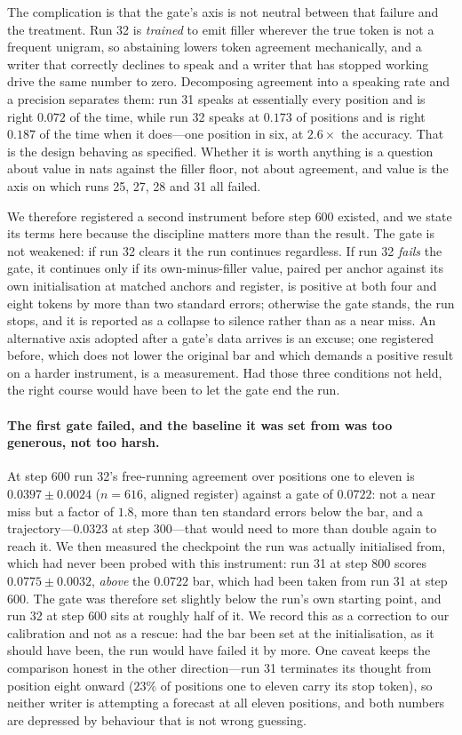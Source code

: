 \documentclass{article} %
\begin{document}
The complication is that the gate's axis is not neutral between that failure and the treatment. Run 32
is \emph{trained} to emit filler wherever the true token is not a frequent unigram, so abstaining lowers
token agreement mechanically, and a writer that correctly declines to speak and a writer that has
stopped working drive the same number to zero. Decomposing agreement into a speaking rate and a
precision separates them: run 31 speaks at essentially every position and is right $0.072$ of the time,
while run 32 speaks at $0.173$ of positions and is right $0.187$ of the time when it does---one position
in six, at $2.6\times$ the accuracy. That is the design behaving as specified. Whether it is worth
anything is a question about value in nats against the filler floor, not about agreement, and value is
the axis on which runs 25, 27, 28 and 31 all failed.

We therefore registered a second instrument before step $600$ existed, and we state its terms here
because the discipline matters more than the result. The gate is not weakened: if run 32 clears it the
run continues regardless. If run 32 \emph{fails} the gate, it continues only if its own-minus-filler
value, paired per anchor against its own initialisation at matched anchors and register, is positive at
both four and eight tokens by more than two standard errors; otherwise the gate stands, the run stops,
and it is reported as a collapse to silence rather than as a near miss. An alternative axis adopted
after a gate's data arrives is an excuse; one registered before, which does not lower the original bar
and which demands a positive result on a harder instrument, is a measurement. Had those three
conditions not held, the right course would have been to let the gate end the run.

\paragraph{The first gate failed, and the baseline it was set from was too generous, not too harsh.}
At step $600$ run 32's free-running agreement over positions one to eleven is
$0.0397 \pm 0.0024$ ($n=616$, aligned register) against a gate of $0.0722$: not a near miss but a
factor of $1.8$, more than ten standard errors below the bar, and a trajectory---$0.0323$ at step
$300$---that would need to more than double again to reach it. We then measured the checkpoint the run
was actually initialised from, which had never been probed with this instrument: run 31 at step $800$
scores $0.0775 \pm 0.0032$, \emph{above} the $0.0722$ bar, which had been taken from run 31 at step
$600$. The gate was therefore set slightly below the run's own starting point, and run 32 at step $600$
sits at roughly half of it. We record this as a correction to our calibration and not as a rescue: had
the bar been set at the initialisation, as it should have been, the run would have failed it by more.
One caveat keeps the comparison honest in the other direction---run 31 terminates its thought from
position eight onward ($23\%$ of positions one to eleven carry its stop token), so neither writer is
attempting a forecast at all eleven positions, and both numbers are depressed by behaviour that is not
wrong guessing.
\end{document}

